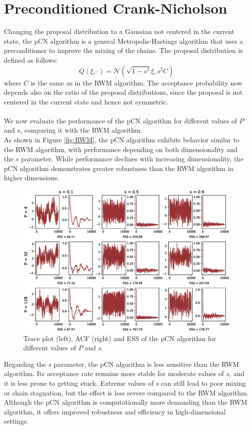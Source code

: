 \documentclass{article}
\begin{document}
\section{Preconditioned Crank-Nicholson}

Changing the proposal distribution to a Gaussian not centered in the current state, the pCN algorithm is a general Metropolis-Hastings algorithm that 
uses a preconditioner to improve the mixing of the chains. The proposal distribution is defined as follows:
\begin{equation}
    Q(\xi,\cdot) = \mathcal{N}(\sqrt{1-s^2}\xi , s^2 C) 
    \label{eq:pCN_proposal}
\end{equation}
where \(C\) is the same as in the RWM algorithm. The acceptance probability now depends also on the ratio of the proposal distributions, since 
the proposal is not centered in the current state and hence not symmetric.\\ \\
We now evaluate the performance of the pCN algorithm for different values of \(P\) and \(s\), comparing it with the RWM algorithm. \\
As shown in Figure \ref{fig:RWM}, the pCN algorithm exhibits behavior similar to the RWM algorithm, with performance depending on 
both dimensionality and the \(s\) parameter. While performance declines with increasing dimensionality, the pCN algorithm demonstrates 
greater robustness than the RWM algorithm in higher dimensions.
\begin{figure}[H]
    \centering
    \includegraphics[width=\textwidth]{plots/pCN.eps}
    \caption{Trace plot (left), ACF (right) and ESS of the pCN algorithm for different values of \(P\) and \(s\).}
    \label{fig:pCN}
\end{figure}
Regarding the \(s\) parameter, the pCN algorithm is less sensitive than the RWM algorithm. Its acceptance 
rate remains more stable for moderate values of \(s\), and it is less prone to getting stuck. Extreme values 
of \(s\) can still lead to poor mixing or chain stagnation, but the effect is less severe compared to the RWM algorithm.\\
Although the pCN algorithm is computationally more demanding than the RWM algorithm, it offers improved robustness and 
efficiency in high-dimensional settings.
\end{document}
